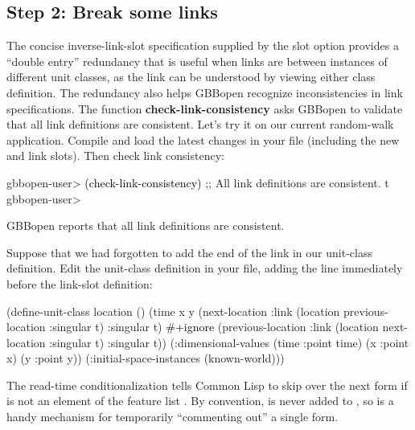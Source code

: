 \documentclass[10pt,twoside,english,pdftex]{article}
\begin{document}
\subsection*{Step 2: Break some links}

The concise inverse-link-slot specification supplied by the
 slot option provides a ``double entry'' redundancy that
is useful when links are between instances of different unit classes,
as the link can be understood by viewing either class definition.  The
redundancy also helps GBBopen recognize inconsistencies in link
specifications.  The function \textbf{check-link-consistency} asks
GBBopen to validate that all link definitions are consistent.  Let's
try it on our current random-walk application.  Compile and load the
latest changes in your  file (including
the new  and  link slots).
Then check link consistency:
%
\W\supp
\begin{example}
\textcolor{darkergray}{%
  gbbopen-user> \textcolor{black}{(check-link-consistency)}
  ;; All link definitions are consistent.
  t
  gbbopen-user>}
\end{example}
%
GBBopen reports that all link definitions are consistent.

Suppose that we had forgotten to add the  end
of the link in our  unit-class definition. Edit the
 unit-class definition in your
 file, adding the line 
immediately before the  link-slot definition:
%
\W\supp
\begin{example}
\textcolor{darkergray}{%
  (define-unit-class location ()
    (time 
     x y
     (next-location
      :link (location previous-location :singular t) 
      :singular t)
      \textcolor{black}{\#+ignore}     
     (previous-location
      :link (location next-location :singular t)  
      :singular t))
    (:dimensional-values
      (time :point time)
      (x :point x)
      (y :point y))
    (:initial-space-instances (known-world)))}
\end{example}

The  read-time conditionalization tells Common Lisp to
skip over the next form if  is not an element of the
feature list .  By convention,  is never
added to , so  is a handy mechanism
for temporarily ``commenting out'' a single form.
\end{document}
